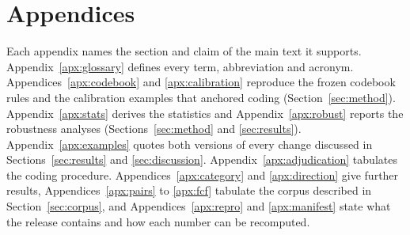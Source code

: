 \documentclass{article}
\begin{document}



\newpage
\appendix
\section*{Appendices}
Each appendix names the section and claim of the main text it supports. Appendix~\ref{apx:glossary} defines every term, abbreviation and acronym. Appendices~\ref{apx:codebook} and \ref{apx:calibration} reproduce the frozen codebook rules and the calibration examples that anchored coding (Section~\ref{sec:method}). Appendix~\ref{apx:stats} derives the statistics and Appendix~\ref{apx:robust} reports the robustness analyses (Sections~\ref{sec:method} and \ref{sec:results}). Appendix~\ref{apx:examples} quotes both versions of every change discussed in Sections~\ref{sec:results} and \ref{sec:discussion}. Appendix~\ref{apx:adjudication} tabulates the coding procedure. Appendices~\ref{apx:category} and \ref{apx:direction} give further results, Appendices~\ref{apx:pairs} to \ref{apx:fcf} tabulate the corpus described in Section~\ref{sec:corpus}, and Appendices~\ref{apx:repro} and \ref{apx:manifest} state what the release contains and how each number can be recomputed.
\end{document}

